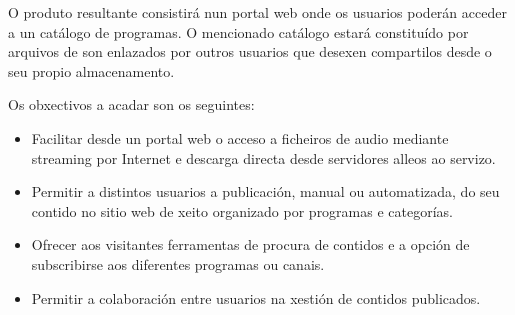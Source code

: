 O produto resultante consistirá nun portal web onde os usuarios poderán acceder a un catálogo de programas. O mencionado catálogo estará constituído por arquivos de son enlazados por outros usuarios que desexen compartilos desde o seu propio almacenamento.

Os obxectivos a acadar son os seguintes:

\begin{itemize}
\item Facilitar desde un portal web o acceso a ficheiros de audio mediante streaming por Internet e descarga directa desde servidores alleos ao servizo.
\item Permitir a distintos usuarios a publicación, manual ou automatizada, do seu contido no sitio web de xeito organizado por programas e categorías.
\item Ofrecer aos visitantes ferramentas de procura de contidos e a opción de subscribirse aos diferentes programas ou canais.
\item Permitir a colaboración entre usuarios na xestión de contidos publicados.
\end{itemize}






